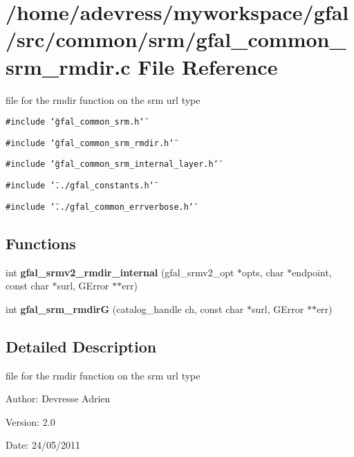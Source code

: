 \section{/home/adevress/myworkspace/gfal/src/common/srm/gfal\_\-common\_\-srm\_\-rmdir.c File Reference}
\label{gfal__common__srm__rmdir_8c}
file for the rmdir function on the srm url type 

{\tt \#include \char`\"{}gfal\_\-common\_\-srm.h\char`\"{}}\par
{\tt \#include \char`\"{}gfal\_\-common\_\-srm\_\-rmdir.h\char`\"{}}\par
{\tt \#include \char`\"{}gfal\_\-common\_\-srm\_\-internal\_\-layer.h\char`\"{}}\par
{\tt \#include \char`\"{}../gfal\_\-constants.h\char`\"{}}\par
{\tt \#include \char`\"{}../gfal\_\-common\_\-errverbose.h\char`\"{}}\par
\subsection*{Functions}
\begin{CompactItemize}
\item 
int \textbf{gfal\_\-srmv2\_\-rmdir\_\-internal} (gfal\_\-srmv2\_\-opt $\ast$opts, char $\ast$endpoint, const char $\ast$surl, GError $\ast$$\ast$err)\label{gfal__common__srm__rmdir_8c_f00f2e024abada581220fa7aaa698101}

\item 
int \textbf{gfal\_\-srm\_\-rmdir\-G} (catalog\_\-handle ch, const char $\ast$surl, GError $\ast$$\ast$err)\label{gfal__common__srm__rmdir_8c_7bafeabed794ea71168deebf806fbbb8}

\end{CompactItemize}


\subsection{Detailed Description}
file for the rmdir function on the srm url type 

\begin{Desc}
\item[Author:]Devresse Adrien \end{Desc}
\begin{Desc}
\item[Version:]2.0 \end{Desc}
\begin{Desc}
\item[Date:]24/05/2011 \end{Desc}
